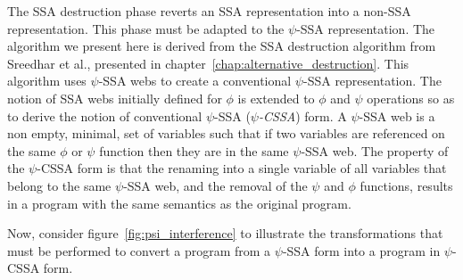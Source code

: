 The SSA destruction phase reverts an SSA representation into a non-SSA
representation. This phase must be adapted to the $\psi$-SSA
representation. The algorithm we present here is derived from the SSA
destruction algorithm from Sreedhar et al., presented in
chapter~\ref{chap:alternative_destruction}. This algorithm uses
$\psi$-SSA webs to create a conventional $\psi$-SSA
representation. The notion of SSA webs initially defined for $\phi$ is
extended to $\phi$ and $\psi$ operations so as to derive the notion of
conventional $\psi$-SSA ({\em $\psi$-CSSA}) form. A $\psi$-SSA web is
a non empty, minimal, set of variables such that if two variables are
referenced on the same $\phi$ or $\psi$ function then they are in the
same $\psi$-SSA web. The property of the $\psi$-CSSA form is that the
renaming into a single variable of all variables that belong to the
same $\psi$-SSA web, and the removal of the $\psi$ and $\phi$
functions, results in a program with the same semantics as the
original program.


Now, consider figure~\ref{fig:psi_interference} to illustrate the
transformations that must be performed to convert a program from a
$\psi$-SSA form into a program in $\psi$-CSSA form.

